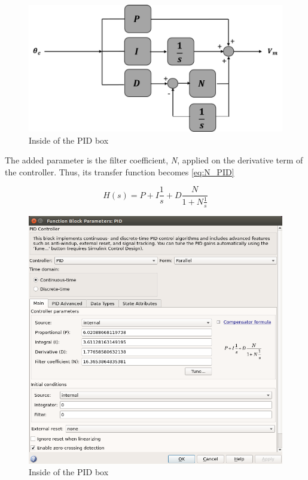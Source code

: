 \begin{figure}[H]
\centering
\includegraphics[scale=0.4]{figures/controller_box.png}
\caption{Inside of the PID box}
\label{PID_box_N}
\end{figure}

The added parameter is the filter coefficient, \textit{N}, applied on the derivative term of the controller. Thus, its transfer function becomes \ref{eq:N_PID}

\begin{equation}\label{eq:N_PID}
H(s) = P + I\frac{1}{s} + D\frac{N}{1+N\frac{1}{s}}
\end{equation}

\begin{figure}[H]
\centering
\includegraphics[scale=0.4]{figures/PID_window.png}
\caption{Inside of the PID box}
\label{dcmotor_circuit}
\end{figure}


